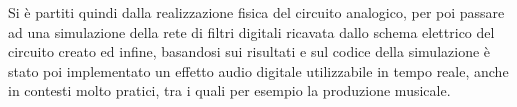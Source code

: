 \documentclass[12pt,a4paper,twoside,english,italian]{book}
\begin{document}
		Si è partiti quindi dalla realizzazione fisica del circuito analogico, per poi passare ad una simulazione della rete di filtri digitali ricavata dallo schema elettrico del circuito creato ed infine, basandosi sui risultati e sul codice della simulazione è stato poi implementato un effetto audio digitale utilizzabile in tempo reale, anche in contesti molto pratici, tra i quali per esempio la produzione musicale.
	
	\mainmatter

	\raggedbottom
	
	
	
	
	
	
	
	
	
	
	
	

	
	
	\appendix
	
	
	
	
	
	\backmatter
	
	\printbibliography
\end{document}
